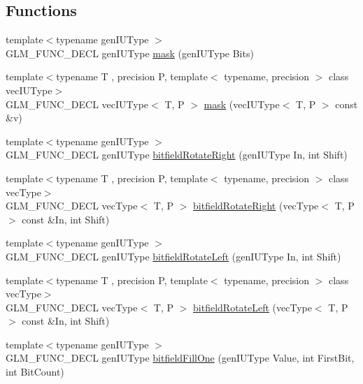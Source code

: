 \subsection*{Functions}
\begin{DoxyCompactItemize}
\item 
{\footnotesize template$<$typename gen\+I\+U\+Type $>$ }\\G\+L\+M\+\_\+\+F\+U\+N\+C\+\_\+\+D\+E\+C\+L gen\+I\+U\+Type \hyperlink{group__gtc__bitfield_gad7eba518a0b71662114571ee76939f8a}{mask} (gen\+I\+U\+Type Bits)
\item 
{\footnotesize template$<$typename T , precision P, template$<$ typename, precision $>$ class vec\+I\+U\+Type$>$ }\\G\+L\+M\+\_\+\+F\+U\+N\+C\+\_\+\+D\+E\+C\+L vec\+I\+U\+Type$<$ T, P $>$ \hyperlink{group__gtc__bitfield_ga073dbd8642f550b51da3572541431c1c}{mask} (vec\+I\+U\+Type$<$ T, P $>$ const \&v)
\item 
{\footnotesize template$<$typename gen\+I\+U\+Type $>$ }\\G\+L\+M\+\_\+\+F\+U\+N\+C\+\_\+\+D\+E\+C\+L gen\+I\+U\+Type \hyperlink{group__gtc__bitfield_ga1c33d075c5fb8bd8dbfd5092bfc851ca}{bitfield\+Rotate\+Right} (gen\+I\+U\+Type In, int Shift)
\item 
{\footnotesize template$<$typename T , precision P, template$<$ typename, precision $>$ class vec\+Type$>$ }\\G\+L\+M\+\_\+\+F\+U\+N\+C\+\_\+\+D\+E\+C\+L vec\+Type$<$ T, P $>$ \hyperlink{group__gtc__bitfield_ga96b56fd2adad1eeaee9e10dfe83904ba}{bitfield\+Rotate\+Right} (vec\+Type$<$ T, P $>$ const \&In, int Shift)
\item 
{\footnotesize template$<$typename gen\+I\+U\+Type $>$ }\\G\+L\+M\+\_\+\+F\+U\+N\+C\+\_\+\+D\+E\+C\+L gen\+I\+U\+Type \hyperlink{group__gtc__bitfield_ga2eb49678a344ce1495bdb5586d9896b9}{bitfield\+Rotate\+Left} (gen\+I\+U\+Type In, int Shift)
\item 
{\footnotesize template$<$typename T , precision P, template$<$ typename, precision $>$ class vec\+Type$>$ }\\G\+L\+M\+\_\+\+F\+U\+N\+C\+\_\+\+D\+E\+C\+L vec\+Type$<$ T, P $>$ \hyperlink{group__gtc__bitfield_ga410d130917d85b865718e3ebc32cf0ef}{bitfield\+Rotate\+Left} (vec\+Type$<$ T, P $>$ const \&In, int Shift)
\item 
{\footnotesize template$<$typename gen\+I\+U\+Type $>$ }\\G\+L\+M\+\_\+\+F\+U\+N\+C\+\_\+\+D\+E\+C\+L gen\+I\+U\+Type \hyperlink{group__gtc__bitfield_ga46f9295abe3b5c7658f5b13c7f819f0a}{bitfield\+Fill\+One} (gen\+I\+U\+Type Value, int First\+Bit, int Bit\+Count)

\end{DoxyCompactItemize}
